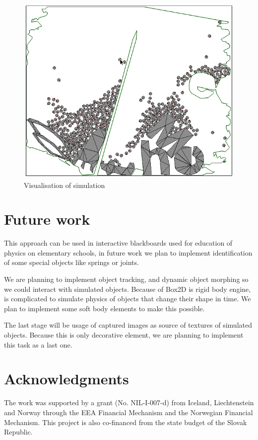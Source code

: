 \documentclass{ifacconf}
\begin{document}
\begin{figure}[h]
\includegraphics[width=\columnwidth]{images/7dynamic-objets-simulation.png}
\caption{Visualisation of simulation}
\label{fig:simulation}
\end{figure}

\section{Future work}
This approach can be used in interactive blackboards used for education of
physics on elementary schools, in future work we plan to implement
identification of some special objects like springs or joints.

We are planning to implement object tracking, and dynamic object morphing so we
could interact with simulated objects. Because of Box2D is rigid body engine,
is complicated to simulate physics of objects that change their shape in time.
We plan to implement some soft body elements to make this possible.

The last stage will be usage of captured images as source of textures of
simulated objects. Because this is only decorative element, we are planning to
implement this task as a last one.

\section*{Acknowledgments}
The work was supported by a grant (No. NIL-I-007-d) from Iceland, Liechtenstein 
and Norway through the EEA Financial Mechanism and the Norwegian Financial 
Mechanism. This project is also co-financed from the state budget of the Slovak
Republic.


%
\end{document}
